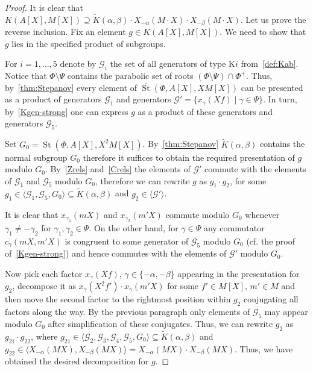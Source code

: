 \documentclass[10pt,a4paper,twoside]{article}
\theoremstyle{remark}
\theoremstyle{definition}
\numberwithin{lemma}{section}
\numberwithin{prop}{section}
\numberwithin{corollary}{section}
\numberwithin{externaltheorem}{section}
\DeclareMathOperator{\St}{St}
\numberwithin{equation}{section}
\begin{document}
\begin{proof}
It is clear that $K(A[X], M[X]) \supseteq \widetilde{K}(\alpha, \beta) \cdot X_{-\alpha}(M \cdot X) \cdot X_{-\beta}(M \cdot X)$. Let us prove the reverse inclusion. Fix an element $g\in K(A[X], M[X])$. We need to show that $g$ lies in the specified product of subgroups.

For $i=1,\ldots,5$ denote by $\mathcal{G}_i$ the set of all generators of type K$i$ from~\cref{def:Kab}.
Notice that $\Phi \setminus \Psi$ contains the parabolic set of roots $(\Phi \setminus \Psi)\cap \Phi^+$.
Thus, by~\cref{thm:Stepanov} every element of $\overline{\St}(\Phi, A[X], XM[X])$ can be presented as a product of generators $\mathcal{G}_1$ and generators $\mathcal{G}' = \{ x_{\gamma}(Xf) \mid \gamma \in \Psi\}$. In turn, by~\cref{Kgen-strong} one can express $g$ as a product of these generators and generators $\mathcal{G}_5$. 

Set $G_0 = \overline{\St}(\Phi, A[X], X^2M[X])$. By~\cref{thm:Stepanov} $\widetilde{K}(\alpha, \beta)$ contains the normal subgroup $G_0$ therefore it suffices to obtain the required presentation of $g$ modulo $G_0$. By~\cref{Zrels} and~\cref{Crels} the elements of $\mathcal{G}'$ commute with the elements of $\mathcal{G}_1$ and $\mathcal{G}_5$ modulo $G_0$, therefore we can rewrite $g$ as $g_1 \cdot g_2$, for some $g_1 \in \langle \mathcal{G}_1, \mathcal{G}_5, G_0 \rangle \subseteq \widetilde{K}(\alpha, \beta)$ and $g_2 \in \langle \mathcal{G}' \rangle$.

It is clear that  $x_{\gamma_1}(mX)$ and $x_{\gamma_2}(m'X)$ commute modulo $G_0$ whenever $\gamma_1 \neq - \gamma_2$ for $\gamma_1, \gamma_2 \in \Psi$. On the other hand, for $\gamma \in \Psi$ any commutator $c_{\gamma}(mX, m'X)$ is congruent to some generator of $\mathcal{G}_5$  modulo $G_0$ (cf. the proof of~\cref{Kgen-strong}) and hence commutes with the elements of $\mathcal{G}'$ modulo $G_0$. 

Now pick each factor $x_{\gamma}(Xf)$, $\gamma \in \{ -\alpha, -\beta \}$ appearing in the presentation for~$g_2$, decompose it as $x_{\gamma}(X^2f') \cdot x_{\gamma}(m'X)$ for some $f' \in M[X]$, $m' \in M$ and then move the second factor to the rightmost position within $g_2$ conjugating all factors along the way. By the previous paragraph only elements of  $\mathcal{G}_5$ may appear modulo $G_0$ after simplification of these conjugates.
Thus, we can rewrite $g_2$ as $g_{21} \cdot g_{22}$, where $g_{21} \in \langle \mathcal{G}_2, \mathcal{G}_3, \mathcal{G}_4, \mathcal{G}_5, G_0 \rangle \subseteq \widetilde{K}(\alpha, \beta)$ and $g_{22} \in \langle X_{-\alpha}(MX), X_{-\beta}(MX) \rangle = X_{-\alpha}(MX) \cdot X_{-\beta}(MX)$.
Thus, we have obtained the desired decomposition for $g$. \end{proof}
\end{document}
